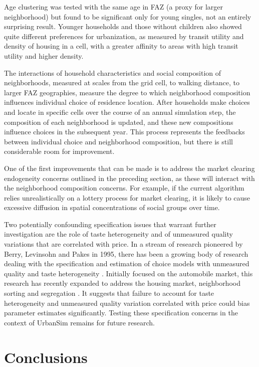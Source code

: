 \documentclass[12pt,a4paper]{article}
\begin{document}
Age clustering was tested with the same age in FAZ (a proxy for
larger neighborhood) but found to be significant only for young
singles, not an entirely surprising result.  Younger households
and those without children also showed quite different preferences
for urbanization, as measured by transit utility and density of
housing in a cell, with a greater affinity to areas with high
transit utility and higher density.

The interactions of household characteristics and social
composition of neighborhoods, measured at scales from the grid
cell, to walking distance, to larger FAZ geographies, measure the
degree to which neighborhood composition influences individual
choice of residence location.  After households make choices and
locate in specific cells over the course of an annual simulation
step, the composition of each neighborhood is updated, and these
new compositions influence choices in the subsequent year. This
process represents the feedbacks between individual choice and
neighborhood composition, but there is still considerable room for
improvement.

One of the first improvements that can be made is to address the
market clearing endogeneity concerns outlined in the preceding
section, as these will interact with the neighborhood composition
concerns.  For example, if the current algorithm relies
unrealistically on a lottery process for market clearing, it is
likely to cause excessive diffusion in spatial concentrations of
social groups over time.

Two potentially confounding specification issues that warrant
further investigation are the role of taste heterogeneity and of
unmeasured quality variations that are correlated with price.  In
a stream of research pioneered by Berry, Levinsohn and Pakes in
1995, there has been a growing body of research dealing with the
specification and estimation of choice models with unmeasured
quality and taste heterogeneity
\cite{berry-econometrica-1995,berry-cowles-2003}. Initially
focused on the automobile market, this research has recently
expanded to address the housing market, neighborhood sorting and
segregation
\cite{bajari-kahn-stanford-working-papers-2002,bayer-mcmillan-rueben-2003}.
It suggests that failure to account for taste heterogeneity and
unmeasured quality variation correlated with price could bias
parameter estimates significantly. Testing these specification
concerns in the context of UrbanSim remains for future research.


\section{Conclusions}
\end{document}
